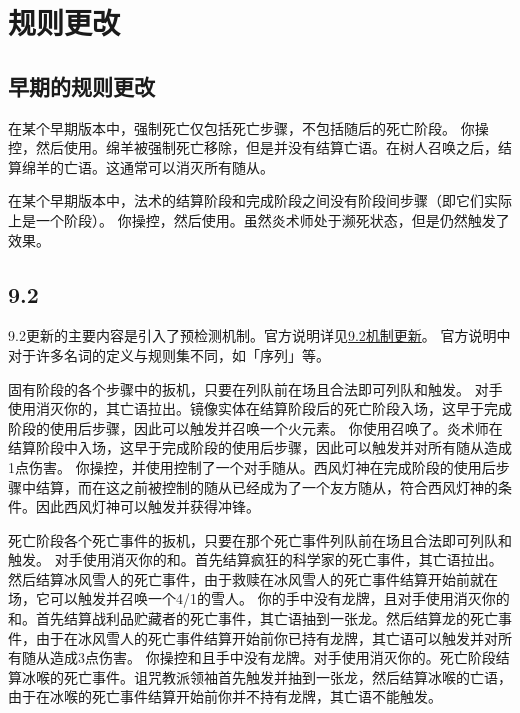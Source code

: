 \chapter{规则更改}
\label{rule-update}

\section{早期的规则更改}
\label{rule-update:early}

在某个早期版本中，强制死亡仅包括死亡步骤，不包括随后的死亡阶段。
\example 你操控，然后使用。绵羊被强制死亡移除，但是并没有结算亡语。在树人召唤之后，结算绵羊的亡语。这通常可以消灭所有随从。

在某个早期版本中，法术的结算阶段和完成阶段之间没有阶段间步骤（即它们实际上是一个阶段）。
\example 你操控，然后使用。虽然炎术师处于濒死状态，但是仍然触发了效果。

\section{9.2}
\label{rule-update:9.2}

9.2更新的主要内容是引入了预检测机制。官方说明详见\href{https://hs.blizzard.cn/article/16/11199}{9.2机制更新}。
\notice 官方说明中对于许多名词的定义与规则集不同，如「序列」等。

固有阶段的各个步骤中的扳机，只要在列队前在场且合法即可列队和触发。
\example 对手使用消灭你的，其亡语拉出。镜像实体在结算阶段后的死亡阶段入场，这早于完成阶段的使用后步骤，因此可以触发并召唤一个火元素。
\example 你使用召唤了。炎术师在结算阶段中入场，这早于完成阶段的使用后步骤，因此可以触发并对所有随从造成1点伤害。
\example 你操控，并使用控制了一个对手随从。西风灯神在完成阶段的使用后步骤中结算，而在这之前被控制的随从已经成为了一个友方随从，符合西风灯神的条件。因此西风灯神可以触发并获得冲锋。

死亡阶段各个死亡事件的扳机，只要在那个死亡事件列队前在场且合法即可列队和触发。
\example 对手使用消灭你的和。首先结算疯狂的科学家的死亡事件，其亡语拉出。然后结算冰风雪人的死亡事件，由于救赎在冰风雪人的死亡事件结算开始前就在场，它可以触发并召唤一个4/1的雪人。
\example 你的手中没有龙牌，且对手使用消灭你的和。首先结算战利品贮藏者的死亡事件，其亡语抽到一张龙。然后结算龙的死亡事件，由于在冰风雪人的死亡事件结算开始前你已持有龙牌，其亡语可以触发并对所有随从造成3点伤害。
\example 你操控和且手中没有龙牌。对手使用消灭你的。死亡阶段结算冰喉的死亡事件。诅咒教派领袖首先触发并抽到一张龙，然后结算冰喉的亡语，由于在冰喉的死亡事件结算开始前你并不持有龙牌，其亡语不能触发。

